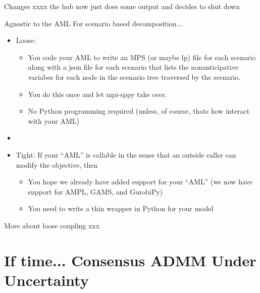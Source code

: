 \documentclass[9pt,usenames,dvipsnames]{beamer}
\begin{document}
\begin{frame}{Changes}
xxxx the hub now just does some output and decides to shut down
\end{frame}



\begin{frame}{Agnostic to the AML}
  For scenario based decomposition...
  \begin{itemize}
  \item Loose:
    \begin{itemize}
    \item You code your AML to write an MPS (or maybe lp) file for each scenario along with a json file for each scenario that lists the nonanticipative variabes for each node in the scenario tree traversed by the scenario.
    \item You do this once and let mpi-sppy take over.
      \item No Python programming required (unless, of course, thats how interact with your AML)
      \end{itemize}
    \item[]
    \item Tight: If your ``AML'' is callable in the sense that an outside caller
      can modify the objective, then
      \begin{itemize}
      \item You hope we already have added support for your ``AML'' (we now have support for AMPL, GAMS, and GurobiPy)
        \item You need to write a thin wrapper in Python for your model
        \end{itemize}
  \end{itemize}
\end{frame}

\begin{frame}{More about loose coupling}
xxx
\end{frame}

\section{If time... Consensus ADMM Under Uncertainty}
\end{document}

